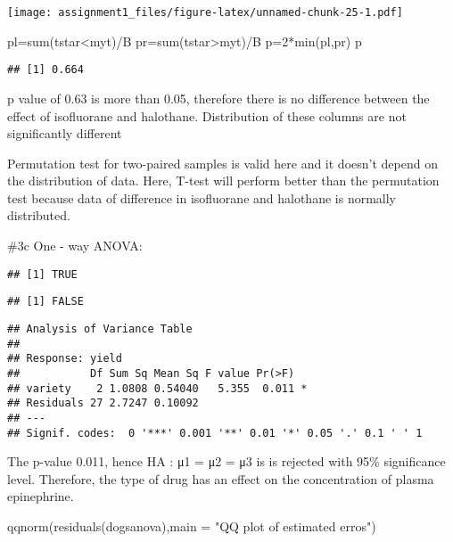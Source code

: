 \documentclass[
]{article}
\newenvironment{Shaded}{\begin{snugshade}}{\end{snugshade}}
\newcommand{\AttributeTok}[1]{\textcolor[rgb]{0.77,0.63,0.00}{#1}}
\newcommand{\DecValTok}[1]{\textcolor[rgb]{0.00,0.00,0.81}{#1}}
\newcommand{\FunctionTok}[1]{\textcolor[rgb]{0.00,0.00,0.00}{#1}}
\newcommand{\NormalTok}[1]{#1}
\newcommand{\OtherTok}[1]{\textcolor[rgb]{0.56,0.35,0.01}{#1}}
\newcommand{\SpecialCharTok}[1]{\textcolor[rgb]{0.00,0.00,0.00}{#1}}
\newcommand{\StringTok}[1]{\textcolor[rgb]{0.31,0.60,0.02}{#1}}
\begin{document}
\texttt{[image: assignment1\_files/figure-latex/unnamed-chunk-25-1.pdf]}

\begin{Shaded}
\begin{Highlighting}[]
\NormalTok{pl}\OtherTok{=}\FunctionTok{sum}\NormalTok{(tstar}\SpecialCharTok{\textless{}}\NormalTok{myt)}\SpecialCharTok{/}\NormalTok{B}
\NormalTok{pr}\OtherTok{=}\FunctionTok{sum}\NormalTok{(tstar}\SpecialCharTok{\textgreater{}}\NormalTok{myt)}\SpecialCharTok{/}\NormalTok{B}
\NormalTok{p}\OtherTok{=}\DecValTok{2}\SpecialCharTok{*}\FunctionTok{min}\NormalTok{(pl,pr)}
\NormalTok{p}
\end{Highlighting}
\end{Shaded}

\begin{verbatim}
## [1] 0.664
\end{verbatim}

p value of 0.63 is more than 0.05, therefore there is no difference
between the effect of isofluorane and halothane. Distribution of these
columns are not significantly different

Permutation test for two-paired samples is valid here and it doesn't
depend on the distribution of data. Here, T-test will perform better
than the permutation test because data of difference in isofluorane and
halothane is normally distributed.

\#3c One - way ANOVA:

\begin{verbatim}
## [1] TRUE
\end{verbatim}

\begin{verbatim}
## [1] FALSE
\end{verbatim}

\begin{verbatim}
## Analysis of Variance Table
## 
## Response: yield
##           Df Sum Sq Mean Sq F value Pr(>F)  
## variety    2 1.0808 0.54040   5.355  0.011 *
## Residuals 27 2.7247 0.10092                 
## ---
## Signif. codes:  0 '***' 0.001 '**' 0.01 '*' 0.05 '.' 0.1 ' ' 1
\end{verbatim}

The p-value 0.011, hence HA : μ1 = μ2 = μ3 is is rejected with 95\%
significance level. Therefore, the type of drug has an effect on the
concentration of plasma epinephrine.

\begin{Shaded}
\begin{Highlighting}[]
\FunctionTok{qqnorm}\NormalTok{(}\FunctionTok{residuals}\NormalTok{(dogsanova),}\AttributeTok{main =} \StringTok{"QQ plot of estimated erros"}\NormalTok{) }
\end{Highlighting}
\end{Shaded}
\end{document}
